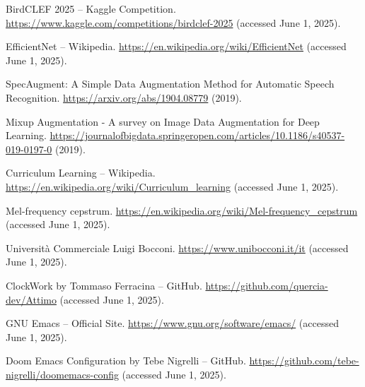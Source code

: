 \documentclass[10pt]{article}
\begin{document}
\newpage

\begin{thebibliography}{10}

BirdCLEF 2025 -- Kaggle Competition. \url{https://www.kaggle.com/competitions/birdclef-2025} (accessed June 1, 2025).

EfficientNet -- Wikipedia. \url{https://en.wikipedia.org/wiki/EfficientNet} (accessed June 1, 2025).

SpecAugment: A Simple Data Augmentation Method for Automatic Speech Recognition. \url{https://arxiv.org/abs/1904.08779} (2019).

Mixup Augmentation - A survey on Image Data Augmentation for Deep Learning. \url{https://journalofbigdata.springeropen.com/articles/10.1186/s40537-019-0197-0} (2019).

Curriculum Learning -- Wikipedia. \url{https://en.wikipedia.org/wiki/Curriculum_learning} (accessed June 1, 2025).

Mel-frequency cepstrum. \url{https://en.wikipedia.org/wiki/Mel-frequency_cepstrum} (accessed June 1, 2025).

Università Commerciale Luigi Bocconi. \url{https://www.unibocconi.it/it} (accessed June 1, 2025).

ClockWork by Tommaso Ferracina -- GitHub. \url{https://github.com/quercia-dev/Attimo} (accessed June 1, 2025).

GNU Emacs -- Official Site. \url{https://www.gnu.org/software/emacs/} (accessed June 1, 2025).

Doom Emacs Configuration by Tebe Nigrelli -- GitHub. \url{https://github.com/tebe-nigrelli/doomemacs-config} (accessed June 1, 2025).

\end{thebibliography}
\end{document}
